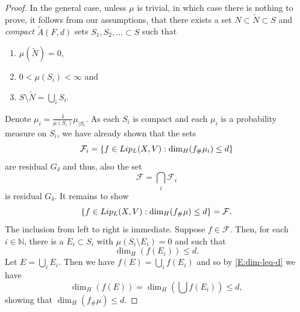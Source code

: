 \documentclass[10pt,a4paper]{amsart}
\def\nat{\mathbb{N}}
\newcommand{\tLip}{\textnormal{Lip}}
\begin{document}
\begin{proof}
    In the general case, unless $\mu$ is trivial, in which case there is nothing to prove, it follows from  our assumptions, that there exists a set $ N\subset \tilde N \subset S$ and \emph{compact} $\tilde{A}(F,d)$ sets $S_1, S_2,\dots\subset S$ such that 
    \begin{enumerate}[label={\rm(\arabic*)}]
        \item $\mu(\tilde N)=0$,
        \item $0<\mu(S_i)<\infty$ and
        \item $S\setminus \tilde{N}= \bigcup_i S_i$.
    \end{enumerate}
    Denote $\mu_i= \frac{1}{\mu(S_i)}\mu_{|S_i}$. As each $S_i$ is compact and each $\mu_i$ is a probability measure on $S_i$, we have already shown that the sets
    \begin{equation*}
        \mathcal{F}_i=\{f\in \tLip_L(X,V): \dim_H(f_\# \mu_i)\leq d\}
    \end{equation*}
    are residual $G_\delta$ and thus, also the set
    \begin{equation*}
        \mathcal{F}=\bigcap_i \mathcal{F}_i
    \end{equation*}
    is residual $G_\delta$. It remains to show
    \begin{equation*}
        \{f\in \tLip_L(X,V): \dim_H(f_\# \mu)\leq d\}=\mathcal{F}.
    \end{equation*}
    The inclusion from left to right is immediate. Suppose $f\in \mathcal{F}$. Then, for each $i\in \nat$, there is a $E_i\subset S_i$ with $\mu(S_i\setminus E_i)=0$ and such that
    \begin{equation}\label{E:dim-leq-d}
        \dim_H(f(E_i))\leq d.
    \end{equation}
    Let $E=\bigcup_i E_i$. Then we have $f(E)=\bigcup_i f(E_i)$ and so by \eqref{E:dim-leq-d} we have
    \begin{equation*}
        \dim_H(f(E))= \dim_H(\bigcup f(E_i))\leq d,
    \end{equation*}
    showing that $\dim_H(f_\# \mu)\leq d$.
\end{proof}
\end{document}
